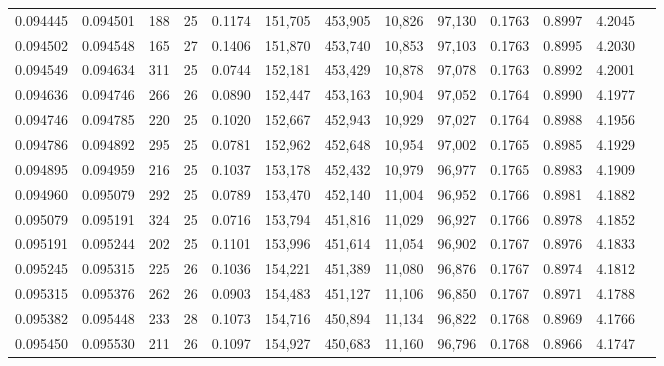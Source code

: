 \begin{tabular}{rrrrrrrrrrrrr}
0.094445 & 0.094501 & 188 &  25 &                                     0.1174 & 151,705 & 453,905 &  10,826 &  97,130 & 0.1763 & 0.8997 & 4.2045 \\
0.094502 & 0.094548 & 165 &  27 &                                     0.1406 & 151,870 & 453,740 &  10,853 &  97,103 & 0.1763 & 0.8995 & 4.2030 \\
0.094549 & 0.094634 & 311 &  25 &                                     0.0744 & 152,181 & 453,429 &  10,878 &  97,078 & 0.1763 & 0.8992 & 4.2001 \\
0.094636 & 0.094746 & 266 &  26 &                                     0.0890 & 152,447 & 453,163 &  10,904 &  97,052 & 0.1764 & 0.8990 & 4.1977 \\
0.094746 & 0.094785 & 220 &  25 &                                     0.1020 & 152,667 & 452,943 &  10,929 &  97,027 & 0.1764 & 0.8988 & 4.1956 \\
0.094786 & 0.094892 & 295 &  25 &                                     0.0781 & 152,962 & 452,648 &  10,954 &  97,002 & 0.1765 & 0.8985 & 4.1929 \\
0.094895 & 0.094959 & 216 &  25 &                                     0.1037 & 153,178 & 452,432 &  10,979 &  96,977 & 0.1765 & 0.8983 & 4.1909 \\
0.094960 & 0.095079 & 292 &  25 &                                     0.0789 & 153,470 & 452,140 &  11,004 &  96,952 & 0.1766 & 0.8981 & 4.1882 \\
0.095079 & 0.095191 & 324 &  25 &                                     0.0716 & 153,794 & 451,816 &  11,029 &  96,927 & 0.1766 & 0.8978 & 4.1852 \\
0.095191 & 0.095244 & 202 &  25 &                                     0.1101 & 153,996 & 451,614 &  11,054 &  96,902 & 0.1767 & 0.8976 & 4.1833 \\
0.095245 & 0.095315 & 225 &  26 &                                     0.1036 & 154,221 & 451,389 &  11,080 &  96,876 & 0.1767 & 0.8974 & 4.1812 \\
0.095315 & 0.095376 & 262 &  26 &                                     0.0903 & 154,483 & 451,127 &  11,106 &  96,850 & 0.1767 & 0.8971 & 4.1788 \\
0.095382 & 0.095448 & 233 &  28 &                                     0.1073 & 154,716 & 450,894 &  11,134 &  96,822 & 0.1768 & 0.8969 & 4.1766 \\
0.095450 & 0.095530 & 211 &  26 &                                     0.1097 & 154,927 & 450,683 &  11,160 &  96,796 & 0.1768 & 0.8966 & 4.1747 \\

\end{tabular}

